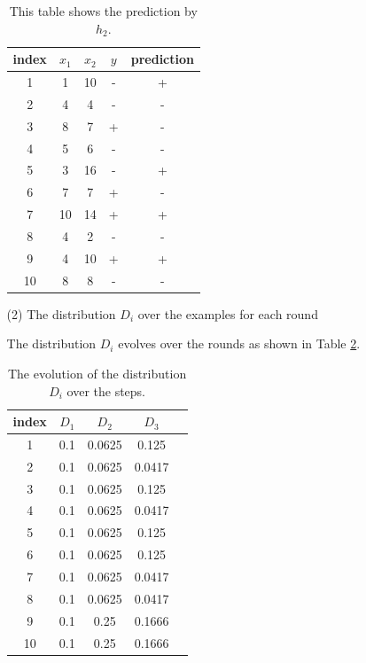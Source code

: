 \begin{enumerate}
\begin{enumerate}
\begin{table}[htb]
  \begin{center}
  \begin{tabular}{|c|c|c|c|c|} \hline
    index & $x_1$ & $x_2$ & $y$ & prediction \\ \hline
    1 & 1 & 10 & - & + \\ \hline
    2 & 4 & 4 & - & - \\ \hline
    3 & 8 & 7 & + & - \\ \hline
    4 & 5 & 6 & - & - \\ \hline
    5 & 3 & 16 & - & + \\ \hline
    6 & 7 & 7 & + & - \\ \hline
    7 & 10 & 14 & + & + \\ \hline
    8 & 4 & 2 & - & - \\ \hline
    9 & 4 & 10 & + & + \\ \hline
    10 & 8 & 8 & - & - \\ \hline
  \end{tabular}
  \caption{This table shows the prediction by $h_2$.}
  \label{tab:1st_round_prediction}
  \end{center}
\end{table}

\item[(2)] The distribution $D_i$ over the examples for each round

The distribution $D_i$ evolves over the rounds as shown in Table \ref{tab:distribution_evolution}.

\begin{table}[htb]
  \begin{center}
  \begin{tabular}{|c|c|c|c|c|} \hline
    index & $D_1$ & $D_2$ & $D_3$ \\ \hline
    1 & 0.1 & 0.0625 & 0.125 \\ \hline
    2 & 0.1 & 0.0625 & 0.0417 \\ \hline
    3 & 0.1 & 0.0625 & 0.125 \\ \hline
    4 & 0.1 & 0.0625 & 0.0417 \\ \hline
    5 & 0.1 & 0.0625 & 0.125 \\ \hline
    6 & 0.1 & 0.0625 & 0.125 \\ \hline
    7 & 0.1 & 0.0625 & 0.0417 \\ \hline
    8 & 0.1 & 0.0625 & 0.0417 \\ \hline
    9 & 0.1 & 0.25 & 0.1666 \\ \hline
    10 & 0.1 & 0.25 & 0.1666 \\ \hline
  \end{tabular}
  \caption{The evolution of the distribution $D_i$ over the steps.}
  \label{tab:distribution_evolution}
  \end{center}
\end{table}


\end{enumerate}
\end{enumerate}
